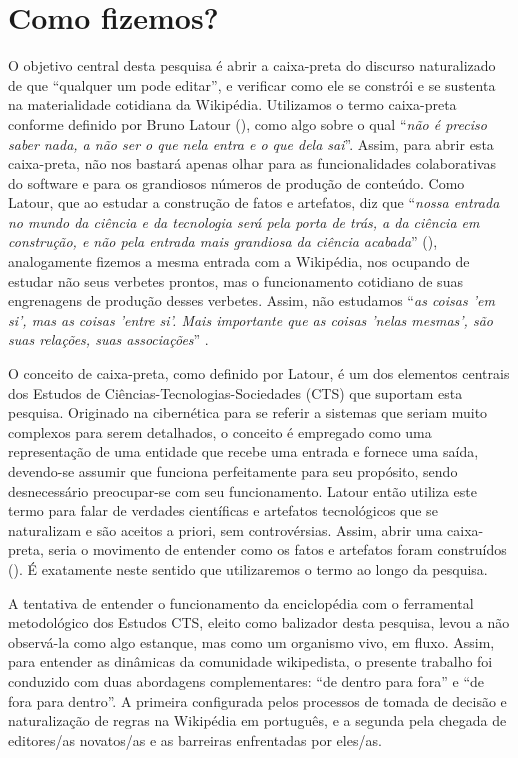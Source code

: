 \section{Como fizemos?}

O objetivo central desta pesquisa é abrir a caixa-preta do discurso naturalizado de que ``qualquer um pode editar'', e verificar como ele se constrói e se sustenta na materialidade cotidiana da Wikipédia. Utilizamos o termo caixa-preta conforme definido por Bruno Latour (\citeyear[p. 4]{latour_ciencia_1987}), como algo sobre o qual ``\textit{não é preciso saber nada, a não ser o que nela entra e o que dela sai}''. Assim, para abrir esta caixa-preta, não nos bastará apenas olhar para as funcionalidades colaborativas do software e para os grandiosos números de produção de conteúdo. Como Latour, que ao estudar a construção de fatos e artefatos, diz que ``\textit{nossa entrada no mundo da ciência e da tecnologia será pela porta de trás, a da ciência em construção, e não pela entrada mais grandiosa da ciência acabada}'' (\citeyear[p. 6]{latour_ciencia_1987}), analogamente fizemos a mesma entrada com a Wikipédia, nos ocupando de estudar não seus verbetes prontos, mas o funcionamento cotidiano de suas engrenagens de produção desses verbetes. Assim, não estudamos ``\textit{as coisas 'em si', mas as coisas 'entre si'. Mais importante que as coisas 'nelas mesmas', são suas relações, suas associações}'' \cite[p. 13]{feitosa_cidadao_2010}.

O conceito de caixa-preta, como definido por Latour, é um dos elementos centrais dos Estudos de Ciências-Tecnologias-Sociedades (CTS) que suportam esta pesquisa. Originado na cibernética para se referir a sistemas que seriam muito complexos para serem detalhados, o conceito é empregado como uma representação de uma entidade que recebe uma entrada e fornece uma saída, devendo-se assumir que funciona perfeitamente para seu propósito, sendo desnecessário preocupar-se com seu funcionamento. Latour então utiliza este termo para falar de verdades científicas e artefatos tecnológicos que se naturalizam e são aceitos a priori, sem controvérsias. Assim, abrir uma caixa-preta, seria o movimento de entender como os fatos e artefatos foram construídos (\citep[p.31]{latour_ciencia_1987}). É exatamente neste sentido que utilizaremos o termo ao longo da pesquisa.

A tentativa de entender o funcionamento da enciclopédia com o ferramental metodológico dos Estudos CTS, eleito como balizador desta pesquisa, levou a não observá-la como algo estanque, mas como um organismo vivo, em fluxo. Assim, para entender as dinâmicas da comunidade wikipedista, o presente trabalho foi conduzido com duas abordagens complementares: ``de dentro para fora'' e ``de fora para dentro''. A primeira configurada pelos processos de tomada de decisão e naturalização de regras na Wikipédia em português, e a segunda pela chegada de editores/as novatos/as e as barreiras enfrentadas por eles/as.

